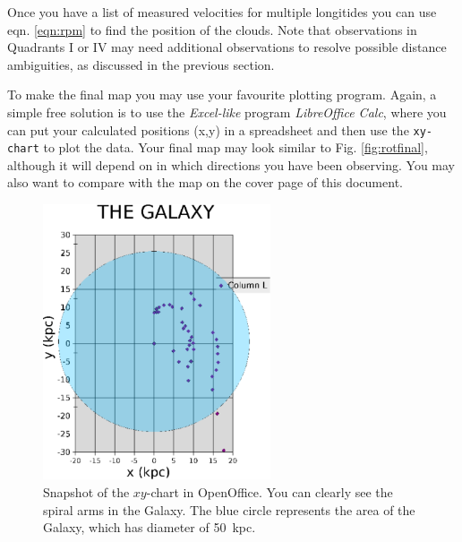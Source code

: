 Once you have a list of measured velocities for multiple longitides you
can use eqn. \ref{eqn:rpm} to find the position of the clouds. Note that
observations in Quadrants I or IV may need additional observations
to resolve possible distance ambiguities, as discussed in the previous section.

To make the final map you may use your favourite plotting program.  Again, a
simple free solution is to use the \emph{Excel-like} program \emph{LibreOffice
Calc}, where you can put your calculated positions (x,y) in a spreadsheet and
then use the {\tt xy-chart} to plot the data.  Your final map may look similar
to Fig. \ref{fig:rotfinal}, although it will depend on in which directions you
have been observing.  You may also want to compare with the map on the cover
page of this document.

\begin{figure}[t]
\begin{center}
\includegraphics[width=0.6\textwidth]{../figures/galaxopenoffice1.pdf}
\caption{Snapshot of the $xy$-chart in OpenOffice.  You can clearly
  see the spiral arms in the Galaxy.  The blue circle represents the
  area of the Galaxy, which has diameter of 50~kpc.}
\label{fig:mapfinal}
\end{center}
\end{figure}
